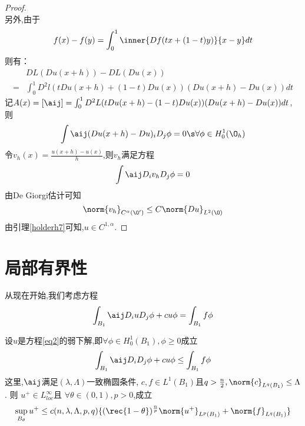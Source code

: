 \begin{proof}
\begin{equation}
    \end{equation}
    另外,由于
    \begin{equation}
        f(x)-f(y)=\int^1_0 \inner{Df(tx+(1-t)y)}{x-y}dt
    \end{equation}
    则有：
    \begin{equation}
        \begin{split}
            &DL(Du(x+h))-DL(Du(x)) \\
           =& \int^1_0 D^2l(tDu(x+h)+(1-t)Du(x))(Du(x+h)-Du(x))dt
        \end{split}
    \end{equation}
    记$A(x)=[\aij]=\int^1_0 D^2L(tDu(x+h)-(1-t)Du(x))(Du(x+h)-Du(x))dt$, 则
    \begin{equation}
        \int \aij(Du(x+h)-Du)_iD_j\phi=0 \s \forall \phi \in H^1_0(\O_h)
    \end{equation}
    令$v_h(x)=\frac{u(x+h)-u(x)}{h}$,则$v_h$满足方程
    \begin{equation}
        \int \aij D_i v_h D_j\phi=0
    \end{equation}
    由De Giorgi估计可知
    \begin{equation}
        \norm{v_h}_{C^\alpha(\O')} \le C\norm{Du}_{L^2(\O)}
    \end{equation}
    由引理\eqref{holderh7}可知,$ u \in C^{1,\alpha}$.
\end{proof}
\section{局部有界性}
从现在开始,我们考虑方程
\begin{equation} \label{eq2}
    \int_{B_1} \aij D_iu D_j \phi + cu\phi = \int_{B_1}f\phi
\end{equation}
\begin{theorem}\label{local_boundedness}
    设$u$是方程\eqref{eq2}的弱下解,即$\forall \phi \in H^1_0(B_1), \phi \ge 0$成立
    \begin{equation}
        \int_{B_1} \aij D_i D_j \phi + cu\phi \le \int_{B_1}f\phi
    \end{equation}
    这里,$\aij$满足$(\lambda,\Lambda)$一致椭圆条件, $c,f\in L^1(B_1)$且$q > \frac{n}{2}, \norm{c}_{L^q(B_1)} \le \Lambda$. 则 $u^+ \in L^\infty_{loc}$且 $\forall \theta \in (0,1), p >0$,成立
    \begin{equation}
        \sup_{B_\theta}u^+ \le c(n,\lambda,\Lambda,p,q)\{(\rec{1-\theta})^{\frac{n }{p}}\norm{u^+}_{L^p(B_1)}+\norm{f}_{L^q(B_1)}\}
    \end{equation}
\end{theorem}
